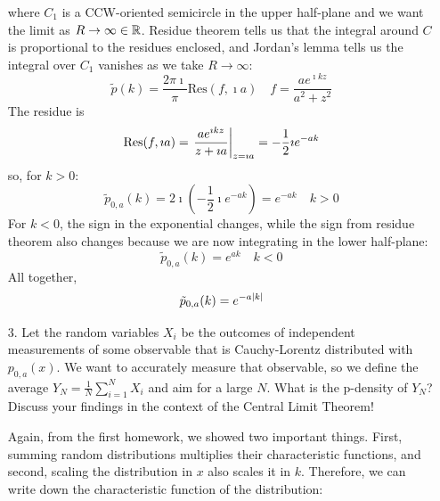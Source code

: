 \documentclass[a4paper,twoside]{article}
\begin{document}
\begin{itemize}
\begin{problem}
            where $ C_1 $ is a CCW-oriented semicircle in the upper half-plane and we want the limit as $ R \to \infty \in \mathbb{R} $. Residue theorem tells us that the integral around $ C $ is proportional to the residues enclosed, and Jordan's lemma tells us the integral over $ C_1 $ vanishes as we take $ R \to \infty $:
            \begin{equation}
                \tilde{p}(k) = \frac{2 \pi\imath}{\pi} \text{Res}(f, \imath a) \quad f = \frac{a e^{\imath k z}}{a^2 + z^2}
            \end{equation}
            The residue is
            \begin{equation}
                \text{Res}(f, \imath a) = \eval{\frac{a e^{\imath k z}}{z + \imath a}}_{z = \imath a} = - \frac{1}{2} \imath e^{-ak}
            \end{equation}
            so, for $ k > 0 $:
            \begin{equation}
                \tilde{p}_{0,a}(k) = 2 \imath \left( - \frac{1}{2} \imath e^{-ak} \right) = e^{-ak}\quad k>0
            \end{equation}
            For $ k < 0 $, the sign in the exponential changes, while the sign from residue theorem also changes because we are now integrating in the lower half-plane:
            \begin{equation}
                \tilde{p}_{0,a}(k) = e^{ak}\quad k<0
            \end{equation}
            All together,
            \begin{equation}
                \tilde{p}_{0,a}(k) = e^{- a \abs{k}}
            \end{equation}
        \end{problem}
    \item[3.] Let the random variables $ X_i $ be the outcomes of independent measurements of some observable that is Cauchy-Lorentz distributed with $ p_{0,a}(x) $. We want to accurately measure that observable, so we define the average $ Y_N = \frac{1}{N} \sum_{i=1}^{N} X_i $ and aim for a large $ N $. What is the p-density of $ Y_N $? Discuss your findings in the context of the Central Limit Theorem!
        \begin{problem}
            Again, from the first homework, we showed two important things. First, summing random distributions multiplies their characteristic functions, and second, scaling the distribution in $ x $ also scales it in $ k $. Therefore, we can write down the characteristic function of the distribution:

\end{problem}
\end{itemize}
\end{document}
